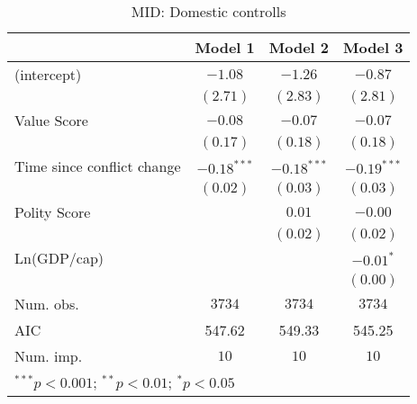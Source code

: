 
\begin{table}
\begin{center}
\begin{tabular}{l c c c}
\toprule
 & Model 1 & Model 2 & Model 3 \\
\midrule
(intercept)                & $-1.08$       & $-1.26$       & $-0.87$       \\
                           & $(2.71)$      & $(2.83)$      & $(2.81)$      \\
Value Score                & $-0.08$       & $-0.07$       & $-0.07$       \\
                           & $(0.17)$      & $(0.18)$      & $(0.18)$      \\
Time since conflict change & $-0.18^{***}$ & $-0.18^{***}$ & $-0.19^{***}$ \\
                           & $(0.02)$      & $(0.03)$      & $(0.03)$      \\
Polity Score               &               & $0.01$        & $-0.00$       \\
                           &               & $(0.02)$      & $(0.02)$      \\
Ln(GDP/cap)                &               &               & $-0.01^{*}$   \\
                           &               &               & $(0.00)$      \\
\midrule
Num. obs.                  & $3734$        & $3734$        & $3734$        \\
AIC                        & 547.62        & 549.33        & 545.25        \\
Num. imp.                  & $10$          & $10$          & $10$          \\
\bottomrule
\multicolumn{4}{l}{\scriptsize{$^{***}p<0.001$; $^{**}p<0.01$; $^{*}p<0.05$}}
\end{tabular}
\caption{MID: Domestic controlls}
\label{MID_1}
\end{center}
\end{table}
